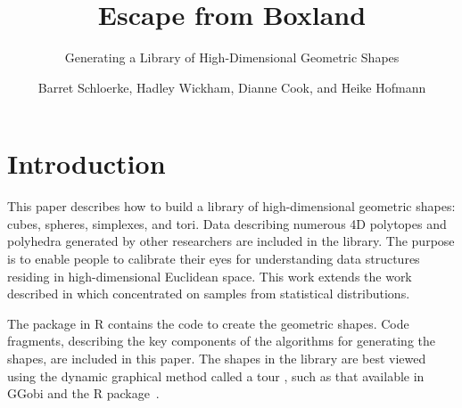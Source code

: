 \title{Escape from Boxland}
\subtitle{Generating a Library of High-Dimensional Geometric Shapes}
\author{Barret Schloerke, Hadley Wickham, Dianne Cook, and Heike Hofmann}

\maketitle





\section{Introduction}

This paper describes how to build a library of high-dimensional
geometric shapes: cubes, spheres, simplexes, and tori. Data
describing numerous 4D polytopes and polyhedra generated by other
researchers are included in the library. The purpose is to enable
people to calibrate their eyes for understanding data structures residing in
high-dimensional Euclidean space. This work extends the work described
in \cite{Co97} which concentrated on samples from statistical
distributions.

 The  package in R \citep{R03} contains
the code to create the geometric shapes. Code fragments, describing
the key components of the algorithms for generating the shapes, are
included in this paper. The shapes in the library are best viewed using the dynamic graphical method called a tour \citep{AS85,BCAH05,ClBW07}, such as that available in GGobi
\citep{STLBC02} and the  R package~\citep{WCHB11}.

